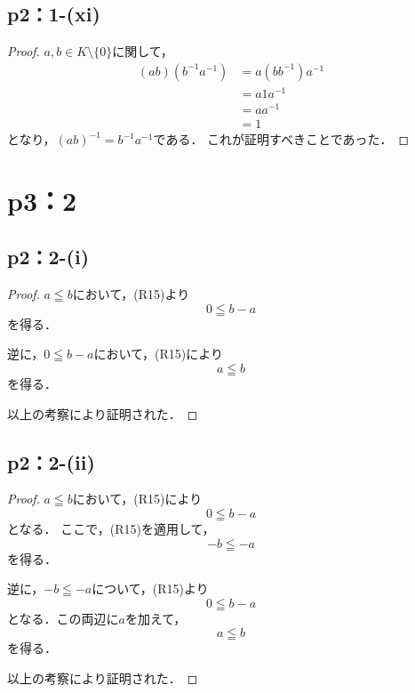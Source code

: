 \documentclass[a4paper,10pt,fleqn]{ltjsarticle}
\begin{document}
\subsection*{p2：1-(xi)}
\begin{leftbar}
    \begin{proof}
        $ a ,b\in K \setminus \{ 0 \} $に関して，
        \begin{align*} 
            (ab) (b^{-1} a^{-1}) & = a (bb^{-1}) a^{-1} \\
            & = a1a^{-1} \\
            & = aa^{-1} \\
            & = 1
        \end{align*} 
        となり，$(ab)^{-1} = b^{-1} a^{-1}$である．
        これが証明すべきことであった．
    \end{proof}
\end{leftbar}
%
\newpage
\section*{p3：2}

\subsection*{p2：2-(i)}

\begin{leftbar}
    \begin{proof}
        $a \leqq b$において，(R15)より
        \[
            0 \leqq b-a
        \]
        を得る．

        逆に，$0 \leqq b-a$において，(R15)により
        \[
            a \leqq b 
        \]
        を得る．

        以上の考察により証明された．
    \end{proof}
    \end{leftbar}

    \subsection*{p2：2-(ii)}
    
    \begin{leftbar}
        \begin{proof}
            $a \leqq b$において，(R15)により
            \[
                0 \leqq b-a
            \]
            となる．
            ここで，(R15)を適用して，
            \[
                -b \leqq -a
            \]
            を得る．

            逆に，$-b\leqq -a$について，(R15)より
            \[
                0 \leqq b -a
            \]
            となる．この両辺に$a$を加えて，
            \[
                a \leqq b 
            \]
            を得る．

            以上の考察により証明された．
        \end{proof}
        \end{leftbar}
\end{document}
